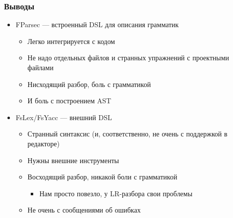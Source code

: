 \documentclass{../../slides-style}
\begin{document}
    \begin{frame}
        \frametitle{Выводы}
        \begin{itemize}
            \item FParsec --- встроенный DSL для описания грамматик
            \begin{itemize}
                \item Легко интегрируется с кодом
                \item Не надо отдельных файлов и странных упражнений с проектными файлами
                \item Нисходящий разбор, боль с грамматикой
                \item И боль с построением AST
            \end{itemize}
            \item FsLex/FsYacc --- внешний DSL
            \begin{itemize}
                \item Странный синтаксис (и, соответственно, не очень с поддержкой в редакторе)
                \item Нужны внешние инструменты
                \item Восходящий разбор, никакой боли с грамматикой
                \begin{itemize}
                    \item Нам просто повезло, у LR-разбора свои проблемы
                \end{itemize}
                \item Не очень с сообщениями об ошибках
            \end{itemize}
        \end{itemize}
    \end{frame}
\end{document}
